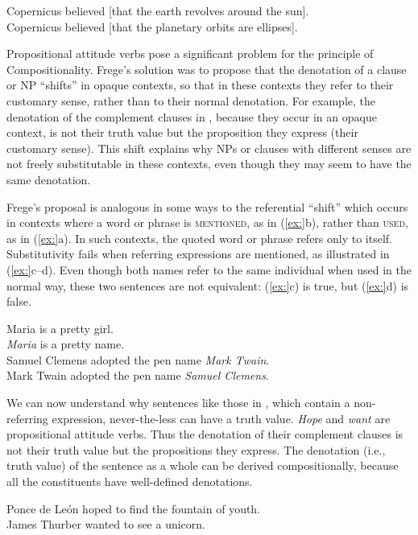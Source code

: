 \ea
\ea Copernicus believed [that the earth revolves around the sun].\\
\ex Copernicus believed [that the planetary orbits are ellipses].
                       \z
\z


Propositional attitude verbs pose a significant problem for the principle of Compositionality. Frege’s solution was to propose that the denotation of a clause or NP “shifts” in opaque contexts, so that in these contexts they refer to their customary sense, rather than to their normal denotation. For example, the denotation of the complement clauses in , because they occur in an opaque context, is not their truth value but the proposition they express (their customary sense). This shift explains why NPs or clauses with different senses are not freely substitutable in these contexts, even though they may seem to have the same denotation.



Frege’s proposal is analogous in some ways to the referential “shift” which occurs in contexts where a word or phrase is \textsc{mentioned}, as in (\ref{ex:}b), rather than \textsc{used}, as in (\ref{ex:}a). In such contexts, the quoted word or phrase refers only to itself. Substitutivity fails when referring expressions are mentioned, as illustrated in (\ref{ex:}c--d). Even though both names refer to the same individual when used in the normal way, these two sentences are not equivalent: (\ref{ex:}c) is true, but (\ref{ex:}d) is false.


\ea
\ea Maria is a pretty girl.\\
\ex \textit{Maria} is a pretty name.\\
\ex Samuel Clemens adopted the pen name \textit{Mark Twain}.\\
\ex Mark Twain adopted the pen name \textit{Samuel Clemens}.
                       \z
\z


We can now understand why sentences like those in , which contain a non-referring expression, never-the-less can have a truth value. \textit{Hope} and \textit{want} are propositional attitude verbs. Thus the denotation of their complement clauses is not their truth value but the propositions they express. The denotation (i.e., truth value) of the sentence as a whole can be derived compositionally, because all the constituents have well-defined denotations.


\ea
\ea Ponce de León hoped to find the fountain of youth.\\
\ex James Thurber wanted to see a unicorn.
                       \z
\z

